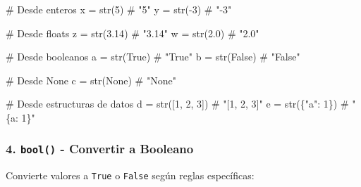 \documentclass[
  doc,
  floatsintext,
  longtable,
  a4paper,
  nolmodern,
  notxfonts,
  notimes,
  12pt,
  colorlinks=true,linkcolor=blue,citecolor=blue,urlcolor=blue]{apa7}
\newenvironment{Shaded}{\begin{snugshade}}{\end{snugshade}}
\newcommand{\BuiltInTok}[1]{\textcolor[rgb]{0.00,0.23,0.31}{#1}}
\newcommand{\CommentTok}[1]{\textcolor[rgb]{0.37,0.37,0.37}{#1}}
\newcommand{\DecValTok}[1]{\textcolor[rgb]{0.68,0.00,0.00}{#1}}
\newcommand{\FloatTok}[1]{\textcolor[rgb]{0.68,0.00,0.00}{#1}}
\newcommand{\NormalTok}[1]{\textcolor[rgb]{0.00,0.23,0.31}{#1}}
\newcommand{\OperatorTok}[1]{\textcolor[rgb]{0.37,0.37,0.37}{#1}}
\newcommand{\StringTok}[1]{\textcolor[rgb]{0.13,0.47,0.30}{#1}}
\newcommand{\VariableTok}[1]{\textcolor[rgb]{0.07,0.07,0.07}{#1}}
\begin{document}
\begin{Shaded}
\begin{Highlighting}[]
\CommentTok{\# Desde enteros}
\NormalTok{x }\OperatorTok{=} \BuiltInTok{str}\NormalTok{(}\DecValTok{5}\NormalTok{)       }\CommentTok{\# "5"}
\NormalTok{y }\OperatorTok{=} \BuiltInTok{str}\NormalTok{(}\OperatorTok{{-}}\DecValTok{3}\NormalTok{)      }\CommentTok{\# "{-}3"}

\CommentTok{\# Desde floats}
\NormalTok{z }\OperatorTok{=} \BuiltInTok{str}\NormalTok{(}\FloatTok{3.14}\NormalTok{)    }\CommentTok{\# "3.14"}
\NormalTok{w }\OperatorTok{=} \BuiltInTok{str}\NormalTok{(}\FloatTok{2.0}\NormalTok{)     }\CommentTok{\# "2.0"}

\CommentTok{\# Desde booleanos}
\NormalTok{a }\OperatorTok{=} \BuiltInTok{str}\NormalTok{(}\VariableTok{True}\NormalTok{)    }\CommentTok{\# "True"}
\NormalTok{b }\OperatorTok{=} \BuiltInTok{str}\NormalTok{(}\VariableTok{False}\NormalTok{)   }\CommentTok{\# "False"}

\CommentTok{\# Desde None}
\NormalTok{c }\OperatorTok{=} \BuiltInTok{str}\NormalTok{(}\VariableTok{None}\NormalTok{)    }\CommentTok{\# "None"}

\CommentTok{\# Desde estructuras de datos}
\NormalTok{d }\OperatorTok{=} \BuiltInTok{str}\NormalTok{([}\DecValTok{1}\NormalTok{, }\DecValTok{2}\NormalTok{, }\DecValTok{3}\NormalTok{])  }\CommentTok{\# "[1, 2, 3]"}
\NormalTok{e }\OperatorTok{=} \BuiltInTok{str}\NormalTok{(\{}\StringTok{"a"}\NormalTok{: }\DecValTok{1}\NormalTok{\})   }\CommentTok{\# "\{\textquotesingle{}a\textquotesingle{}: 1\}"}
\end{Highlighting}
\end{Shaded}

\subsubsection{\texorpdfstring{4. \texttt{bool()} - Convertir a
Booleano}{4. bool() - Convertir a Booleano}}\label{bool---convertir-a-booleano}

Convierte valores a \texttt{True} o \texttt{False} según reglas
específicas:
\end{document}
